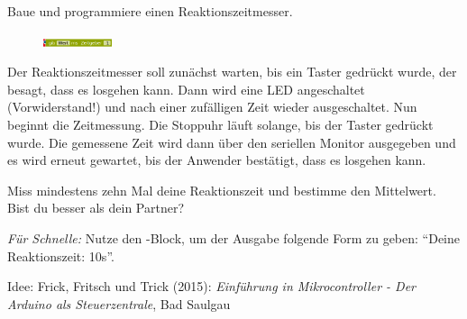 \begin{projekt}[Reaktionszeitmesser]\label{proj:reaktionszeitmesser}
	Baue und programmiere einen Reaktionszeitmesser.
	
	\begin{figure}
		\centering
		\includegraphics[width=0.18\textwidth]{pics/stoppuhr.png}
	\end{figure}
	Der Reaktionszeitmesser soll zunächst warten, bis ein Taster gedrückt wurde, der besagt, dass es losgehen kann. Dann wird eine LED angeschaltet (Vorwiderstand!) und nach einer zufälligen Zeit wieder ausgeschaltet. Nun beginnt die Zeitmessung. Die Stoppuhr läuft solange, bis der Taster gedrückt wurde. Die gemessene Zeit wird dann über den seriellen Monitor ausgegeben und es wird erneut gewartet, bis der Anwender bestätigt, dass es losgehen kann.
	
	Miss mindestens zehn Mal deine Reaktionszeit und bestimme den Mittelwert. Bist du besser als dein Partner?
	
	\emph{Für Schnelle:} Nutze den -Block, um der Ausgabe folgende Form zu geben: \enquote{Deine Reaktionszeit: 10s}.
	
	{\scriptsize Idee: Frick, Fritsch und Trick (2015): \emph{Einführung in Mikrocontroller - Der Arduino als Steuerzentrale}, Bad Saulgau}
\end{projekt}

